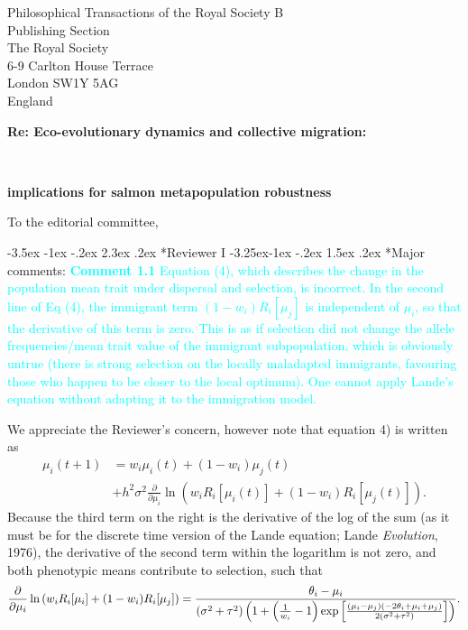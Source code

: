 \documentclass[ucm,12pt]{ucletter}
\makeatletter
\newcounter{section}
\newcounter{subsection}[section]
\renewcommand\section{\@startsection {section}{1}{\z@}%
                                   {-3.5ex \@plus -1ex \@minus -.2ex}%
                                   {2.3ex \@plus.2ex}%
                                   {\normalfont\Large\bfseries}}
\newcommand\subsection{\@startsection{subsection}{2}{\z@}%
                                     {-3.25ex\@plus -1ex \@minus -.2ex}%
                                     {1.5ex \@plus .2ex}%
                                     {\normalfont\large\bfseries}}
\makeatother
\begin{document}
\begin{letter}{
    Philosophical Transactions of the Royal Society B\\
    Publishing Section\\
    The Royal Society\\
    6-9 Carlton House Terrace\\
    London SW1Y 5AG\\
    England\\
    \centerline{\bf{Re: Eco-evolutionary dynamics and collective migration:}}\\
     \centerline{\bf{implications for salmon metapopulation robustness}}
}


\opening{To the editorial committee,}


\section*{Reviewer I}
\subsection*{Major comments:}
\noindent \textcolor{cyan}{
{\bf Comment 1.1} Equation (4), which describes the change in the population mean trait under dispersal and selection, is incorrect. In the second line of Eq (4), the immigrant term $(1-w_i) R_i [\mu_j]$ is independent of $\mu_i$, so that the derivative of this term is zero. This is as if selection did not change the allele frequencies/mean trait value of the immigrant subpopulation, which is obviously untrue (there is strong selection on the locally maladapted immigrants, favouring those who happen to be closer to the local optimum). One cannot apply Lande's equation without adapting it to the immigration model.
}

 We appreciate the Reviewer's concern, however note that equation 4) is written as
\begin{align}
  \label{eq:mu}
  \mu_i(t+1) &= w_i\mu_i(t) + (1-w_i)\mu_j(t) \\ \nonumber
  &+ h^2\sigma^2\frac{\partial}{\partial \mu_i}\ln\left(w_i R_i[\mu_i(t)] + (1-w_i)R_i[\mu_j(t)]  \right).
\end{align}
Because the third term on the right is the derivative of the log of the sum (as it must be for the discrete time version of the Lande equation; Lande \emph{Evolution}, 1976), the derivative of the second term within the logarithm is not zero, and both phenotypic means contribute to selection, such that
\begin{equation}
  \frac{\partial}{\partial \mu_i}\ln\left(w_i R_i[\mu_i] + (1-w_i)R_i[\mu_j]  \right) = \frac{\theta_i-\mu_i}{\left(\sigma ^2+\tau ^2\right) \left(1+\left(\frac{1}{w_i}-1\right) {\rm exp}\left[\frac{(\mu_i-\mu_j) (-2 \theta_i+\mu_i+\mu_j)}{2 \left(\sigma ^2+\tau ^2\right)}\right]\right)}.
\end{equation}


\end{letter}
\end{document}
